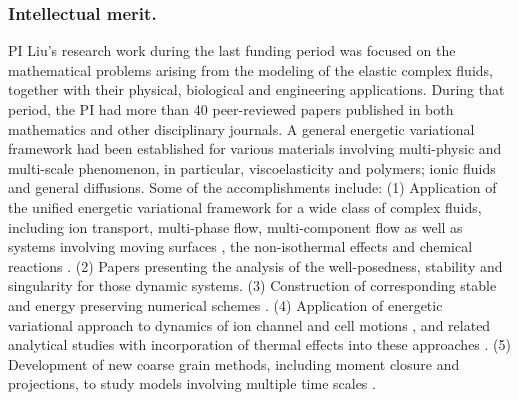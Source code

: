 \documentclass[11pt]{NSFamsart}
\begin{document}
 \subsubsection*{Intellectual merit.}  
PI Liu's research work during the last funding period was focused on the mathematical problems
arising from the modeling of the elastic complex fluids, together
with their physical, biological and engineering applications.
During that period, the PI had more than 40 peer-reviewed papers published in both mathematics and  other disciplinary journals. A general energetic variational framework had been established for various materials
involving multi-physic and multi-scale phenomenon,  in particular, viscoelasticity and polymers;  ionic fluids and general diffusions.
Some of the accomplishments include: (1) Application of the unified energetic variational framework for a wide class of complex fluids, including ion transport, multi-phase flow,
multi-component flow as well as systems involving moving  surfaces \cite{HuLiLi18,
yang_thermodynamically_2018,benesova_existence_2018, deng_largest_2017,xu_strong_2017,benesova_existence_2018,liu_energetic_2019, Kirshtein2020}, the non-isothermal effects \cite{de2019non,liu2018non, hsieh2020global, Jan-Eric}
and chemical reactions \cite{terebus2018discrete, wang2020field}. 
(2) Papers \cite{liu_energetic_2019, epshteyn2019large, Jan-Eric, hsieh2020global} presenting the analysis of the well-posedness, stability and singularity
for those dynamic systems. (3) Construction of corresponding stable and energy preserving numerical schemes \cite{duan_numerical_2019,xu_numerical_2019,duan_numerical_2019-2, wu2019energetic, liu2020lagrangian, liu2020variational, liu2020structure,duan2020structure}.
 (4)  Application of energetic variational approach to dynamics of ion channel and cell motions \cite{horng_continuum_2019,gavish_bistable_2018, liu_generalized_2017},
and related analytical studies \cite{WaLiTa17, hsieh2020global} with incorporation of thermal effects into these approaches \cite{liu2018non, wu2019energetic, hsieh2020global}.  (5) Development of new coarse grain  methods, including moment closure and projections, to study models involving multiple time scales
\cite{ma_fluctuation-dissipation_2017,ma_coarse-graining_2019}.

\end{document}
